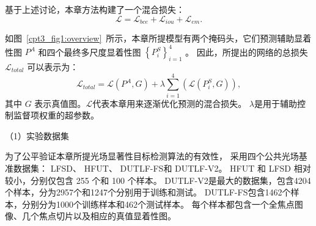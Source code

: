基于上述讨论，本章方法构建了一个混合损失：
%
%
%
\begin{equation} 
	\mathcal L = \mathcal L_{bce} + \mathcal L_{iou}  + \mathcal L_{em}  .
\end{equation}
%
%
%
%
\par
%
%
如图~\ref{cpt3_fig1:overview}~所示，本章所提模型有两个掩码头，它们预测辅助显着性图 $ P^{A} $ 和四个最终多尺度显着性图 $ \left \{ P_{i}^{S} \right \}_{i=1}^{4} $ 。 因此，所提出的网络的总损失 $ \mathcal L_{total} $ 可以表示为： 
%
\begin{equation}
	\mathcal L_{total} = \mathcal L\left ( P^{A}, G \right ) + \lambda  \sum_{i=1}^{4} \left ( \mathcal L \left (  P_{i}^{S},G \right )\right ),
	\label{chpt3:equ:loss_total}
\end{equation}
%
%
%
其中 $ G $ 表示真值图。$ \mathcal L $代表本章用来逐渐优化预测的混合损失。 $ \lambda $是用于辅助控制监督项权重的超参数。























（1）实验数据集


为了公平验证本章所提光场显著性目标检测算法的有效性，
采用四个公共光场基准数据集：
LFSD、
HFUT、
DUTLF-FS和 
DUTLF-V2。 
HFUT 和 LFSD 相对较小，分别仅包含 255 个和 100 个样本。 
DUTLF-V2是最大的数据集，包含4204个样本，分为2957个和1247个分别用于训练和测试。 
DUTLF-FS包含1462个样本，分别分为1000个训练样本和462个测试样本。 
每个样本都包含一个全焦点图像、几个焦点切片以及相应的真值显着性图。





